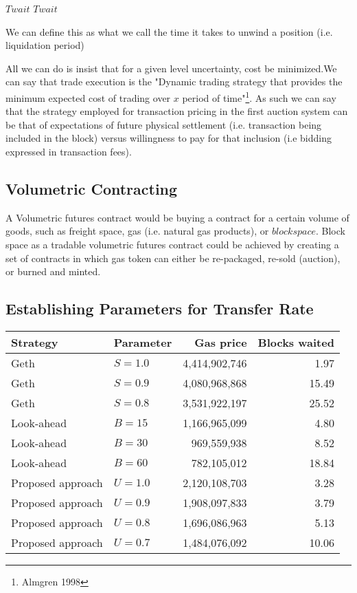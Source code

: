 $Twait$
    \vspace{2mm}
$Twait$
    \vspace{2mm}



We can define this as what we call the time it takes to unwind a position (i.e. liquidation period)

    \vspace{2mm}

All we can do is insist that for a given level uncertainty, cost be minimized.We can say that trade execution is the "Dynamic trading
strategy that provides the minimum expected cost of trading over $x$
period of time"\footnote{Almgren 1998}. As such we can say that the
strategy employed for transaction pricing in the first auction system
can be that of expectations of future physical settlement (i.e.
transaction being included in the block) versus willingness to pay for
that inclusion (i.e bidding expressed in transaction fees).
    \vspace{2mm}
\subsection{Volumetric Contracting}

A Volumetric futures contract would be buying a contract for a certain
volume of goods, such as freight space, gas (i.e. natural gas
products), or $block space$. Block space as a tradable volumetric
futures contract could be achieved by creating a set of contracts in
which gas token can either be re-packaged, re-sold (auction), or burned and minted.
    \vspace{2mm}
\subsection{Establishing Parameters for Transfer Rate}

\begin{tabular}{llrr}
\hline Strategy & Parameter & Gas price & Blocks waited \\
\hline Geth & \(S =1.0\) & 4,414,902,746 & 1.97 \\
Geth & \(S =0.9\) & 4,080,968,868 & 15.49 \\
Geth & \(S =0.8\) & 3,531,922,197 & 25.52 \\
\hline Look-ahead & \(B =15\) & 1,166,965,099 & 4.80 \\
Look-ahead & \(B =30\) & 969,559,938 & 8.52 \\
Look-ahead & \(B =60\) & 782,105,012 & 18.84 \\
\hline Proposed approach & \(U =1.0\) & 2,120,108,703 & 3.28 \\
Proposed approach & \(U =0.9\) & 1,908,097,833 & 3.79 \\
Proposed approach & \(U =0.8\) & 1,696,086,963 & 5.13 \\
Proposed approach & \(U =0.7\) & 1,484,076,092 & 10.06
\end{tabular}
    \vspace{2mm}
